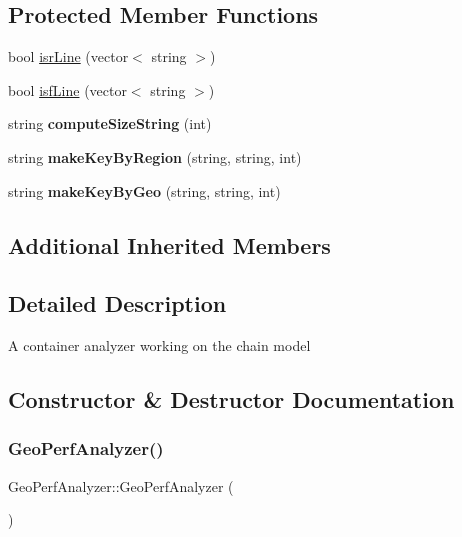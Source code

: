 \subsection*{Protected Member Functions}
\begin{DoxyCompactItemize}
\item 
bool \mbox{\hyperlink{class_geo_perf_analyzer_a7259d409b07fc693bcc22a224c0e8c46}{isr\+Line}} (vector$<$ string $>$)
\item 
bool \mbox{\hyperlink{class_geo_perf_analyzer_a12fffe365c38eecb23093d3f7326cf79}{isf\+Line}} (vector$<$ string $>$)
\item 
\mbox{\label{class_geo_perf_analyzer_a77bb6143e63e0ea5b87584714079bcb0}} 
string {\bfseries compute\+Size\+String} (int)
\item 
\mbox{\label{class_geo_perf_analyzer_a877ad78df3759dd3749f22e6352155f1}} 
string {\bfseries make\+Key\+By\+Region} (string, string, int)
\item 
\mbox{\label{class_geo_perf_analyzer_a451285e5235378bd904836a1baaeb22e}} 
string {\bfseries make\+Key\+By\+Geo} (string, string, int)
\end{DoxyCompactItemize}
\subsection*{Additional Inherited Members}


\subsection{Detailed Description}
A container analyzer working on the chain model 

\subsection{Constructor \& Destructor Documentation}
\mbox{\label{class_geo_perf_analyzer_ac0414642cebe142c3d76c826978884c2}} 
\subsubsection{\texorpdfstring{Geo\+Perf\+Analyzer()}{GeoPerfAnalyzer()}}
{\footnotesize\ttfamily Geo\+Perf\+Analyzer\+::\+Geo\+Perf\+Analyzer (\begin{DoxyParamCaption}{ }\end{DoxyParamCaption})}

